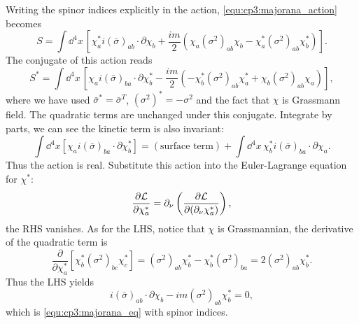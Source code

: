 \begin{problembody}
    \item Writing the spinor indices explicitly in the action, \eqref{equ:cp3:majorana_action} becomes
    \begin{equation*}
        S = \int \dd^4x \, \left[\chi_a^\ast i(\bar{\sigma})_{ab}\cdot\partial\chi_b + \frac{im}{2}\left(\chi_a(\sigma^2)_{ab}\chi_b - \chi_a^\ast (\sigma^2)_{ab}\chi_b^\ast\right)\right].
    \end{equation*}
    The conjugate of this action reads
    \begin{equation*}
        S^\ast = \int \dd^4x \, \left[\chi_a i(\bar{\sigma})_{ba}\cdot\partial\chi_b^\ast - \frac{im}{2}\left(-\chi_b^\ast (\sigma^2)_{ab}\chi_a^\ast + \chi_b (\sigma^2)_{ab} \chi_a\right)\right],
    \end{equation*}
    where we have used $\bar{\sigma}^\ast = \bar{\sigma}^T$, $(\sigma^2)^\ast = -\sigma^2$ and the fact that $\chi$ is Grassmann field. The quadratic terms are unchanged 
    under this conjugate. Integrate by parts, we can see the kinetic term is also invariant:
    \begin{equation*}
        \int \dd^4x \left[\chi_a i(\bar{\sigma})_{ba}\cdot\partial\chi_b^\ast\right] = (\text{surface term}) + \int \dd^4x \, \chi_b^\ast i (\bar{\sigma})_{ba}\cdot\partial\chi_a.
    \end{equation*}
    Thus the action is real. Substitute this action into the Euler-Lagrange equation for $\chi^\ast$:
    \begin{equation*}
        \frac{\partial \mathcal{L}}{\partial \chi_a^\ast} = \partial_\nu \left(\frac{\partial \mathcal{L}}{\partial (\partial_\nu\chi_a^\ast)}\right),
    \end{equation*}
    the RHS vanishes. As for the LHS, notice that $\chi$ is Grassmannian, the derivative of the quadratic term is
    \begin{equation*}
        \frac{\partial}{\partial\chi_a^\ast} \left[\chi_b^\ast (\sigma^2)_{bc} \chi_c^\ast\right]
        = (\sigma^2)_{ab} \chi_b^\ast - \chi_b^\ast(\sigma^2)_{ba}
        = 2 (\sigma^2)_{ab} \chi_b^\ast.
    \end{equation*}
    Thus the LHS yields
    \begin{equation*}
        i(\bar{\sigma})_{ab}\cdot\partial\chi_b - im(\sigma^2)_{ab}\chi_b^\ast = 0,
    \end{equation*}
    which is \eqref{equ:cp3:majorana_eq} with spinor indices.


\end{problembody}
